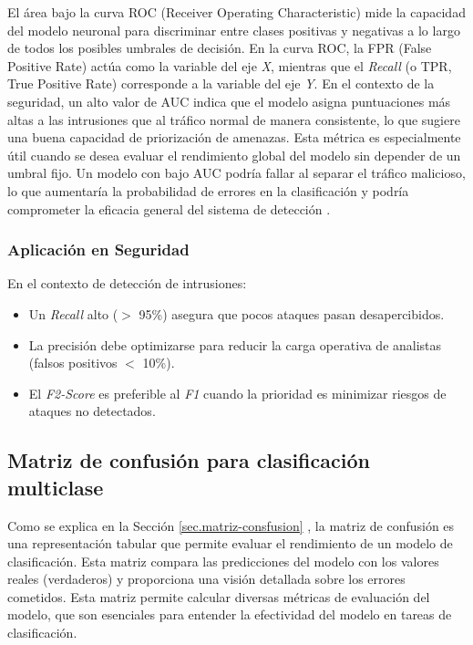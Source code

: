 \begin{itemize}
El área bajo la curva ROC (Receiver Operating Characteristic) mide la capacidad del modelo neuronal para discriminar entre clases positivas y negativas a lo largo de todos los posibles umbrales de decisión. 
En la curva ROC, la FPR (False Positive Rate) actúa como la variable del eje \textit{X}, mientras que el \textit{Recall} (o TPR, True Positive Rate) corresponde a la variable del eje \textit{Y}. En el contexto de la seguridad, un alto valor de AUC indica que el modelo asigna puntuaciones más altas a las intrusiones que al tráfico normal de manera consistente, lo que sugiere una buena capacidad de priorización de amenazas. Esta métrica es especialmente útil cuando se desea evaluar el rendimiento global del modelo sin depender de un umbral fijo. Un modelo con bajo AUC podría fallar al separar el tráfico malicioso, lo que aumentaría la probabilidad de errores en la clasificación y podría comprometer la eficacia general del sistema de detección \cite{fawcett2006introduction}.

\end{itemize}

\subsubsection{Aplicación en Seguridad}	\label{sec:apli-met-seg}
En el contexto de detección de intrusiones:
\begin{itemize}
    \item Un \textit{Recall} alto ($>$ 95\%) asegura que pocos ataques pasan desapercibidos.
    \item La precisión debe optimizarse para reducir la carga operativa de analistas (falsos positivos $<$ 10\%).
    \item El \textit{F2-Score} es preferible al \textit{F1} cuando la prioridad es minimizar riesgos de ataques no detectados.
\end{itemize}




\subsection{Matriz de confusión para clasificación multiclase} \label{sec.matriz-consfusion-multi}

Como se explica en la Sección \ref{sec.matriz-consfusion} , la matriz de confusión es una representación tabular que permite evaluar el rendimiento de un modelo de clasificación. Esta matriz compara las predicciones del modelo con los valores reales (verdaderos) y proporciona una visión detallada sobre los errores cometidos. Esta matriz permite calcular diversas métricas de evaluación del modelo, que son esenciales para entender la efectividad del modelo en tareas de clasificación.


